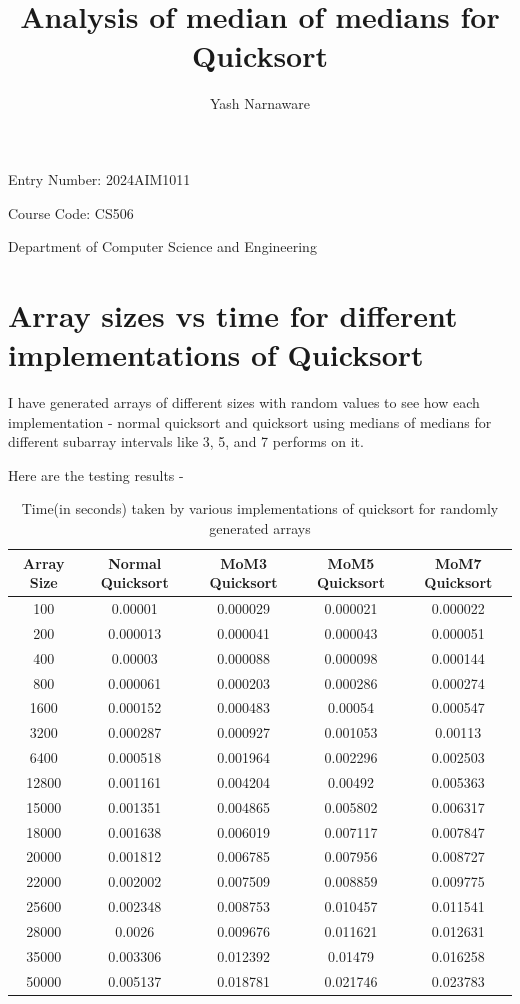 \documentclass{report}
\author{Yash Narnaware}
\title{Analysis of median of medians for Quicksort}
\makeatletter
\renewcommand{\maketitle}{
    \begin{titlepage}
        \centering
        \vspace*{2cm}

        {\LARGE \bfseries \@title \par}
        \vspace{1.5cm}
        {\Large \@author \par}
        
        { Entry Number: 2024AIM1011 \par}
        \vspace{-0.3cm}
        {Course Code: CS506 \par}
        {\Large Department of Computer Science and Engineering \par}
        \vspace{2cm}
        
        \vfill
    \end{titlepage}
}
\makeatother
\begin{document}
\maketitle

\renewcommand{\arraystretch}{0.6}


\setlength{\tabcolsep}{2pt}

\section*{Array sizes vs time for different implementations of Quicksort}
I have generated arrays of different sizes with random values to see how each implementation - normal quicksort and quicksort using medians of medians for different subarray intervals like 3, 5, and 7 performs on it.

Here are the testing results - 

\begin{table}[H]
\centering
\footnotesize
\begin{tabular}{|c|c|c|c|c|}
\hline
\textbf{Array Size} & \textbf{Normal Quicksort} & \textbf{MoM3 Quicksort} & \textbf{MoM5 Quicksort} & \textbf{MoM7 Quicksort} \\ \hline
100   & 0.00001  & 0.000029  & 0.000021  & 0.000022  \\ \hline
200   & 0.000013 & 0.000041  & 0.000043  & 0.000051  \\ \hline
400   & 0.00003  & 0.000088  & 0.000098  & 0.000144  \\ \hline
800   & 0.000061 & 0.000203  & 0.000286  & 0.000274  \\ \hline
1600  & 0.000152 & 0.000483  & 0.00054   & 0.000547  \\ \hline
3200  & 0.000287 & 0.000927  & 0.001053  & 0.00113   \\ \hline
6400  & 0.000518 & 0.001964  & 0.002296  & 0.002503  \\ \hline
12800 & 0.001161 & 0.004204  & 0.00492   & 0.005363  \\ \hline
15000 & 0.001351 & 0.004865  & 0.005802  & 0.006317  \\ \hline
18000 & 0.001638 & 0.006019  & 0.007117  & 0.007847  \\ \hline
20000 & 0.001812 & 0.006785  & 0.007956  & 0.008727  \\ \hline
22000 & 0.002002 & 0.007509  & 0.008859  & 0.009775  \\ \hline
25600 & 0.002348 & 0.008753  & 0.010457  & 0.011541  \\ \hline
28000 & 0.0026   & 0.009676  & 0.011621  & 0.012631  \\ \hline
35000 & 0.003306 & 0.012392  & 0.01479   & 0.016258  \\ \hline
50000 & 0.005137 & 0.018781  & 0.021746  & 0.023783  \\ \hline
\end{tabular}
\caption{Time(in seconds) taken by various implementations of quicksort for randomly generated arrays}
\label{table:quicksort_comparison}
\end{table}
\end{document}
